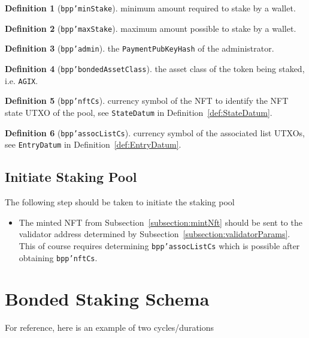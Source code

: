 \documentclass[10pt, a4paper]{article}
\theoremstyle{definition}
\newtheorem{definition}{Definition}[section]
\begin{document}
\begin{definition}[\texttt{bpp'minStake}]\label{def:bpp'minStake}
minimum amount required to stake by a wallet.
\end{definition}

\begin{definition}[\texttt{bpp'maxStake}]\label{def:bpp'maxStake}
maximum amount possible to stake by a wallet.
\end{definition}

\begin{definition}[\texttt{bpp'admin}]\label{def:bpp'admin}
the \texttt{PaymentPubKeyHash} of the administrator.
\end{definition}

\begin{definition}[\texttt{bpp'bondedAssetClass}]\label{def:bpp'bondedAssetClass}
the asset class of the token being staked, i.e. \texttt{AGIX}.
\end{definition}

\begin{definition}[\texttt{bpp'nftCs}]\label{def:bpp'nftCs}
currency symbol of the NFT to identify the NFT state UTXO of the pool, see \texttt{StateDatum} in Definition~\ref{def:StateDatum}.
\end{definition}

\begin{definition}[\texttt{bpp'assocListCs}]\label{def:bpp'assocListCs}
currency symbol of the associated list UTXOs, see \texttt{EntryDatum} in Definition~\ref{def:EntryDatum}.
\end{definition}

\subsection{Initiate Staking Pool}
The following step should be taken to initiate the staking pool
\begin{itemize}
\item{The minted NFT from Subsection~\ref{subsection:mintNft} should be sent to the validator address determined by Subsection~\ref{subsection:validatorParams}. This of course requires determining \texttt{bpp'assocListCs} which is possible after obtaining \texttt{bpp'nftCs}.}
\end{itemize}

\section{Bonded Staking Schema}
For reference, here is an example of two cycles/durations
\end{document}
